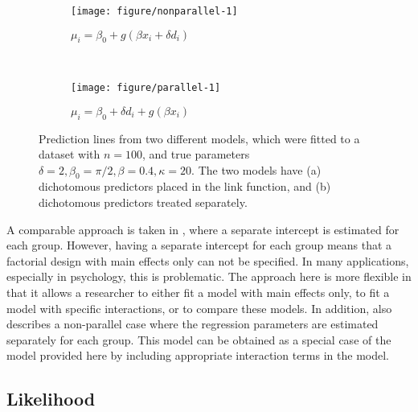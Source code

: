 \begin{figure}

\begin{subfigure}[b]{0.5\textwidth}



\begin{knitrout}
\color{fgcolor}
\texttt{[image: figure/nonparallel-1]} 

\end{knitrout}
\caption{$\mu_i = \beta_0 + g(\beta x_i  + \delta d_i)$}
\label{nonparallel}
\end{subfigure}
~
\begin{subfigure}[b]{0.5\textwidth}
\begin{knitrout}
\color{fgcolor}
\texttt{[image: figure/parallel-1]} 

\end{knitrout}
\caption{$\mu_i = \beta_0  + \delta d_i + g(\beta x_i)$}
\label{parallel}
\end{subfigure}

\caption{Prediction lines from two different models, which were fitted to a dataset with $n = 100$, and true parameters $\delta = 2, \beta_0 = \pi/2, \beta = 0.4, \kappa = 20$. The two models have (a) dichotomous predictors placed in the link function, and (b) dichotomous predictors treated separately.}
\label{parallelnonparallel}
\end{figure}

A comparable approach is taken in \citet{artes2008hypothesis}, where a separate intercept is estimated for each group. However, having a separate intercept for each group means that a factorial design  with main effects only can not be specified. In many applications, especially in psychology, this is problematic. The approach here is more flexible in that it allows a researcher to either fit a model with main effects only, to fit a model with specific interactions, or to compare these models. In addition, \citet{artes2008hypothesis} also describes a non-parallel case where the regression parameters are estimated separately for each group. This model can be obtained as a special case of the model provided here by including appropriate interaction terms in the model.



\subsection{Likelihood}

